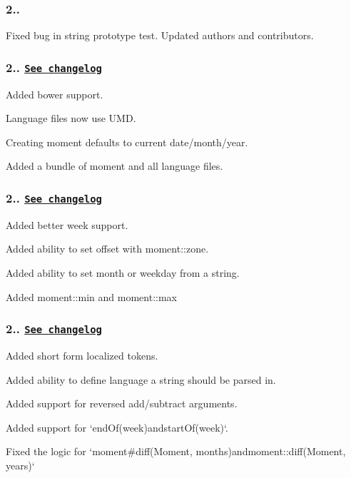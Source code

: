 \subsubsection*{2..}

Fixed bug in string prototype test. Updated authors and contributors.

\subsubsection*{2.. \href{https://gist.github.com/ichernev/00f837a9baf46a3565e4}{\tt See changelog}}

Added bower support.

Language files now use U\+MD.

Creating moment defaults to current date/month/year.

Added a bundle of moment and all language files.

\subsubsection*{2.. \href{https://gist.github.com/timrwood/b8c2d90d528eddb53ab5}{\tt See changelog}}

Added better week support.

Added ability to set offset with {\ttfamily moment\+::zone}.

Added ability to set month or weekday from a string.

Added {\ttfamily moment\+::min} and {\ttfamily moment\+::max}

\subsubsection*{2.. \href{https://gist.github.com/timrwood/e72f2eef320ed9e37c51}{\tt See changelog}}

Added short form localized tokens.

Added ability to define language a string should be parsed in.

Added support for reversed add/subtract arguments.

Added support for `end\+Of(\textquotesingle{}week\textquotesingle{}){\ttfamily and}start\+Of(\textquotesingle{}week\textquotesingle{})`.

Fixed the logic for `moment\#diff(Moment, \textquotesingle{}months\textquotesingle{}){\ttfamily and}moment\+::diff(Moment, \textquotesingle{}years\textquotesingle{})`

